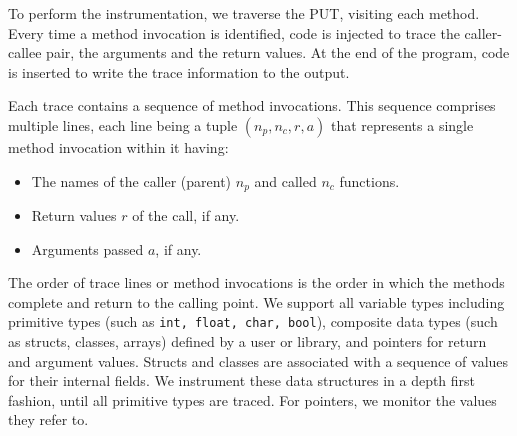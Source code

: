 \newcommand{\callerName}{\ensuremath{n_p}\xspace}
\newcommand{\calleeName}{\ensuremath{n_c}\xspace}
\newcommand{\rVal}{\ensuremath{r}\xspace}
\newcommand{\argVals}{\ensuremath{a}\xspace}
To perform the instrumentation, we traverse the PUT, visiting each method. Every time a method invocation is identified, code is injected to trace the caller-callee pair, the arguments and the return values. At the end of the program, code is inserted to write the trace information to the output.

Each trace contains a sequence of method invocations. This sequence comprises multiple lines, each line being a tuple $(\callerName, \calleeName, \rVal, \argVals)$ that represents a single method invocation within it having:

\begin{itemize}
\item The names of the caller (parent) \callerName and called \calleeName functions.
\item Return values \rVal of the call, if any.%
\item Arguments passed \argVals, if any.
\end{itemize}
The order of trace lines or method invocations is the order in which the methods complete and return to the calling point. We support all variable types including primitive types (such as \texttt{int, float, char, bool}), composite data types (such as structs, classes, arrays) defined by a user or library,  and pointers for return and argument values. Structs and classes are associated with a sequence of values for their internal fields. We instrument these data structures in a depth first fashion, until all primitive types are traced. For pointers, we monitor the values they refer to.  %





